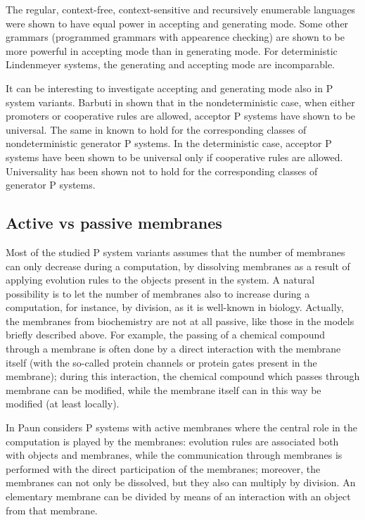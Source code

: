 The regular, context-free, context-sensitive and recursively enumerable languages were shown to have equal power in accepting and generating mode.
Some other grammars (programmed grammars with appearence checking) are shown to be more powerful in accepting mode than in generating mode.
For deterministic Lindenmeyer systems, the generating and accepting mode are incomparable.


It can be interesting to investigate accepting and generating mode also in P system variants. Barbuti in \cite{Barbuti:2010:AcceptingGenerating} shown that in the nondeterministic case, when either promoters or cooperative rules are allowed, acceptor P systems have shown to be universal. The same in known to hold for the corresponding classes of nondeterministic generator P systems. In the deterministic case, acceptor P systems have been shown to be universal only if cooperative rules are allowed. Universality has been shown not to hold for the corresponding classes of generator P systems.


\subsection{Active vs passive membranes} %
\label{sub:active_vs_passive_membranes}

Most of the studied P system variants assumes that the number of membranes can only decrease during a computation, by dissolving membranes as a result of applying evolution rules to the objects present in the system.
A natural possibility is to let the number of membranes also to increase during a computation, for instance, by division, as it is well-known in biology. Actually, the membranes from biochemistry are not at all passive, like those in the models briefly described above.
For example, the passing of a chemical compound through a membrane is often done by a direct interaction with the membrane itself (with the so-called protein channels or protein gates present in the membrane); during this interaction, the chemical compound which passes through membrane can be modified, while the membrane itself can in this way be modified (at least locally).

In \cite{Paun99ActiveMembranes} Paun considers P systems with active membranes where the central role in the computation is played by the membranes: evolution rules are associated both with objects and membranes, while the communication through membranes is performed with the direct participation of the membranes; moreover, the membranes can not only be dissolved, but they also can multiply by division. An elementary membrane can be divided by means of an interaction with an object from that membrane.

